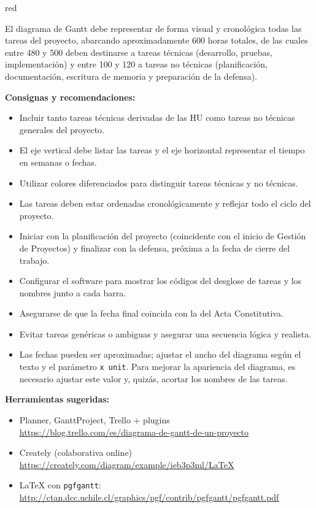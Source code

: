 \documentclass[
11pt, %
]{charter}
\begin{document}
\begin{consigna}{red} %

El diagrama de Gantt debe representar de forma visual y cronológica todas las tareas del proyecto, abarcando aproximadamente 600 horas totales, de las cuales entre 480 y 500 deben destinarse a tareas técnicas (desarrollo, pruebas, implementación) y entre 100 y 120 a tareas no técnicas (planificación, documentación, escritura de memoria y preparación de la defensa).

\textbf{Consignas y recomendaciones:}
\begin{itemize}
  \item Incluir tanto tareas técnicas derivadas de las HU como tareas no técnicas generales del proyecto.
  \item El eje vertical debe listar las tareas y el eje horizontal representar el tiempo en semanas o fechas.
  \item Utilizar colores diferenciados para distinguir tareas técnicas y no técnicas.
  \item Las tareas deben estar ordenadas cronológicamente y reflejar todo el ciclo del proyecto.
  \item Iniciar con la planificación del proyecto (coincidente con el inicio de Gestión de Proyectos) y finalizar con la defensa, próxima a la fecha de cierre del trabajo.
  \item Configurar el software para mostrar los códigos del desglose de tareas y los nombres junto a cada barra.
  \item Asegurarse de que la fecha final coincida con la del Acta Constitutiva.
  \item Evitar tareas genéricas o ambiguas y asegurar una secuencia lógica y realista.
  \item Las fechas pueden ser aproximadas; ajustar el ancho del diagrama según el texto y el parámetro \texttt{x unit}. Para mejorar la apariencia del diagrama, es necesario ajustar este valor y, quizás, acortar los nombres de las tareas.
\end{itemize}

\textbf{Herramientas sugeridas:}
\begin{itemize}
  \item Planner, GanttProject, Trello + plugins\\
  \url{https://blog.trello.com/es/diagrama-de-gantt-de-un-proyecto}
  \item Creately (colaborativa online)\\
  \url{https://creately.com/diagram/example/ieb3p3ml/LaTeX}
  \item LaTeX con \texttt{pgfgantt}:\\
  \url{http://ctan.dcc.uchile.cl/graphics/pgf/contrib/pgfgantt/pgfgantt.pdf}
\end{itemize}


\end{consigna}
\end{document}
